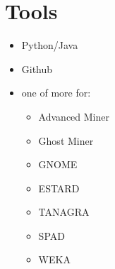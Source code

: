 \documentclass[12pt]{article}
\begin{document}
\section{Tools}
\begin{itemize}
	\item Python/Java
	\item Github
	\item one of more for:
	\begin{itemize}
		\item Advanced Miner
		\item Ghost Miner
		\item GNOME
		\item ESTARD
		\item TANAGRA
		\item SPAD
		\item WEKA
	\end{itemize}
\end{itemize}
\end{document}
